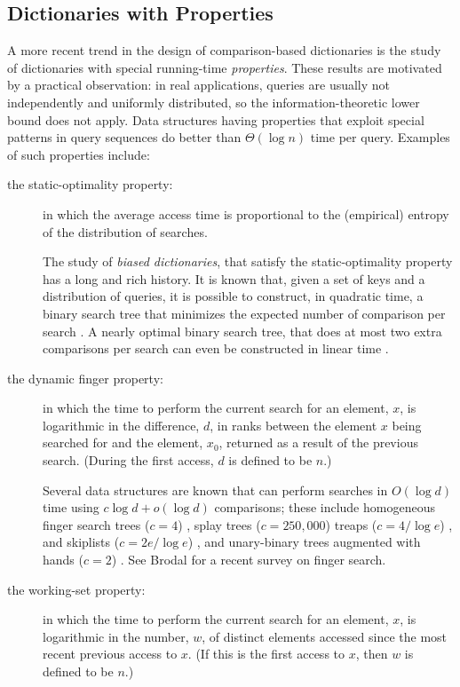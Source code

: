 \documentclass{patmorin}
\begin{document}
\subsection{Dictionaries with Properties}

A more recent trend in the design of comparison-based dictionaries is the
study of dictionaries with special running-time \emph{properties}.  These
results are motivated by a practical observation: in real applications,
queries are usually not independently and uniformly distributed, so the
information-theoretic lower bound does not apply.  Data structures having
properties that exploit special patterns in query sequences do better than
$\Theta(\log n)$ time per query.  Examples of such properties include:
\begin{description}
\item[the static-optimality property:] in which the average access time is
    proportional to the (empirical) entropy of the distribution of
    searches.  

    The study of \emph{biased dictionaries}, that satisfy the
    static-optimality property has a long and rich history.  It is
    known that, given a set of keys and a distribution of queries,
    it is possible to construct, in quadratic time, a binary search
    tree that minimizes the expected number of comparison per search
    \cite{knuth}.  A nearly optimal binary search tree, that does at
    most two extra comparisons per search can even be constructed in
    linear time \cite{mehlhorn}.

\item[the dynamic finger property:] in which the time to perform the
    current search for an element, $x$, is logarithmic in the difference,
    $d$, in ranks between the element $x$ being searched for and the
    element, $x_0$, returned as a result of the previous search. (During
    the first access, $d$ is defined to be $n$.)

    Several data structures are known that can perform searches
    in $O(\log d)$ time using $c\log d+o(\log d)$ comparisons; these
    include homogeneous finger search trees ($c=4$) \cite{tarjan:xxx},
    splay trees ($c=250,000$) \cite{cole} treaps ($c=4/\log e$)
    \cite{sksk}, and skiplists  ($c=2e/\log e$) \cite{sksk}, and
    unary-binary trees augmented with hands ($c=2$) \cite{X,Y}.
    See Brodal \cite{brodal:finger} for a recent survey on finger search.

\item[the working-set property:] in which the time to perform the current
    search for an element, $x$, is logarithmic in the number, $w$, of
    distinct elements accessed since the most recent previous access to
    $x$.  (If this is the first access to $x$, then $w$ is defined to be $n$.)


\end{description}
\end{document}
